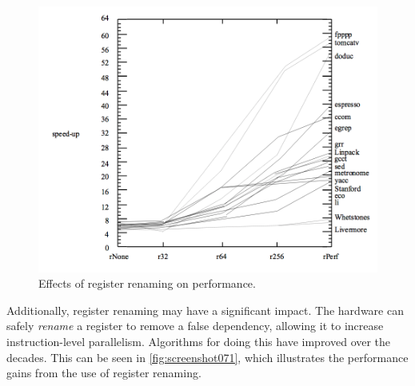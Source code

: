 \begin{figure}
\centering
\includegraphics[width=0.7\linewidth]{figures/screenshot071}
\caption{Effects of register renaming on performance.}
\label{fig:screenshot071}
\end{figure}


Additionally, register renaming may have a significant impact. The hardware can safely \textit{rename} a register to remove a false dependency, allowing it to increase instruction-level parallelism. Algorithms for doing this have improved over the decades. This can be seen in \autoref{fig:screenshot071}, which illustrates the performance gains from the use of register renaming.
